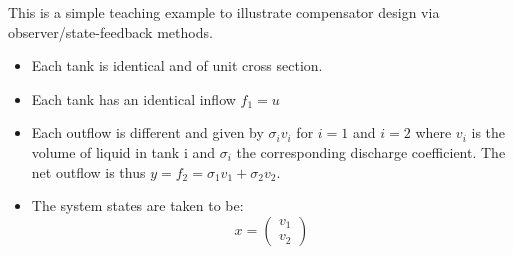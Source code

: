 

This is a simple teaching example to illustrate compensator design via
observer/state-feedback methods.

\begin{itemize}
\item Each tank is identical and of unit cross section.
\item Each tank has an identical inflow $f_1 = u$
\item Each outflow is different and given by $\sigma_i v_i$ for $i=1$
  and $i=2$ where $v_i$ is the volume of liquid in tank i and
  $\sigma_i$ the corresponding discharge coefficient. The net outflow
  is thus $y = f_2 = \sigma_1 v_1 + \sigma_2 v_2$.
\item The system states are taken to be:
  \begin{equation}
    x = 
    \begin{pmatrix}
      v_1 \\ v_2
    \end{pmatrix}
  \end{equation}
\end{itemize}




